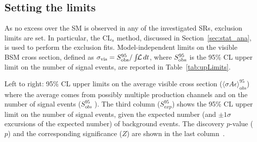  		\subsection{Setting the limits}
 		\label{subsec:limitset}

			As no excess over the \ac{SM} is observed in any of the investigated \acp{SR}, exclusion limits are set. In particular, the $\mathrm{CL}_s$ method, discussed in Section~\ref{sec:stat_ana}, is used to perform the exclusion fits. Model-independent limits on the visible \ac{BSM} cross section, defined as $\sigma_{\mathrm{vis}} = S^{95}_{\textnormal{obs}}/\int\!\!{\mathcal L}\,dt$, where $S^{95}_{\textnormal{obs}}$ is the 95\% CL upper limit on the number of signal events, are reported in Table~\ref{tab:upLimits}.

			\begin{table}[htpb]
		  \caption{Left to right: 95\% CL upper limits on the average visible cross section ($\langle\sigma A \epsilon\rangle_{\mathrm obs}^{95}$) where the average comes from possibly multiple production channels and on the number of signal events ($S_{\mathrm obs}^{95}$ ).  The third column ($S_{\mathrm exp}^{95}$) shows the 95\% CL upper limit on the number of signal events, given the expected number (and $\pm 1\sigma$ excursions of the expected number) of background events. The discovery $p$-value ($p$) and the corresponding significance ($Z$) are shown in the last column~\cite{stop0L}.}
			\label{tab:upLimits}
			\begin{center}
		    
			\end{center}
			\end{table}

